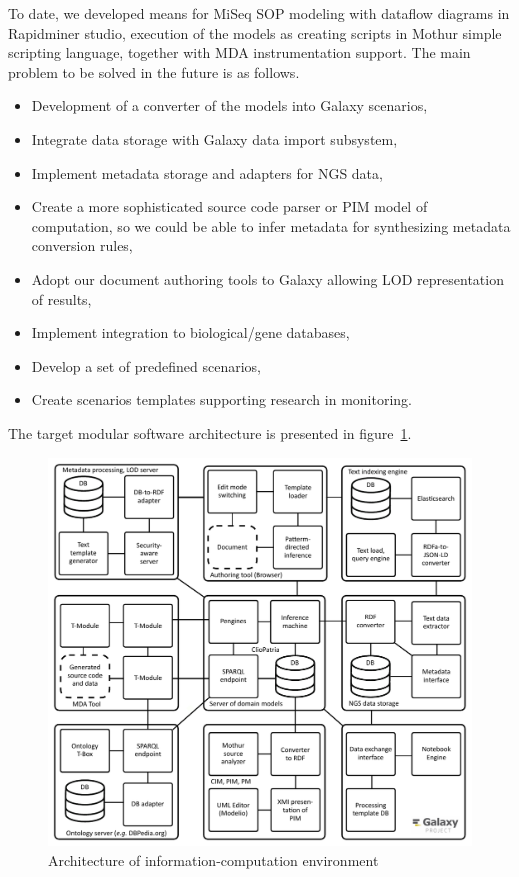 \documentclass[a4paper]{jpconf}
\begin{document}
To date, we developed means for MiSeq SOP modeling with dataflow diagrams in Rapidminer studio, execution of the models as creating scripts in Mothur simple scripting language, together with MDA instrumentation support. The main problem to be solved in the future is as follows.
\begin{itemize}
\item Development of a converter of the models into Galaxy scenarios,
\item Integrate data storage with Galaxy data import subsystem,
\item Implement metadata storage and adapters for NGS data,
\item Create a more sophisticated source code parser or PIM model of computation, so we could be able to infer metadata for synthesizing metadata conversion rules,
\item Adopt our document authoring tools to Galaxy allowing LOD representation of results,
\item Implement integration to biological/gene databases,
\item Develop a set of predefined scenarios,
\item Create scenarios templates supporting research in monitoring.
\end{itemize}
The target modular software architecture is presented in figure~\ref{fig:metadata}.
\begin{figure}[bt]
  \centering
   \includegraphics[width=0.8\linewidth]{architecture-mda-lod-ext-galaxy.pdf}
  \caption{Architecture of information-computation environment}
  \label{fig:metadata}
\end{figure}
\end{document}

